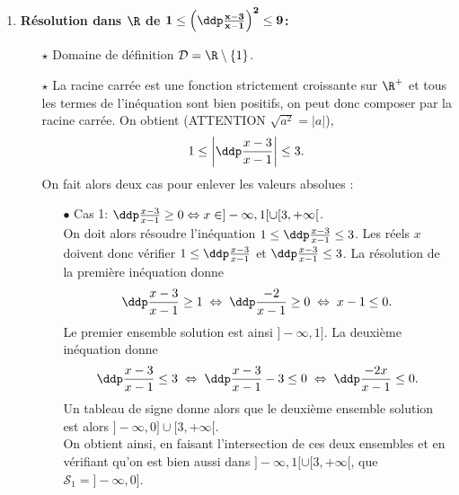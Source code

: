 \begin{correction}
\begin{enumerate}
\item \textbf{R\'esolution dans $\mathbf{\R}$ de $\mathbf{1\leq \left(\ddp\frac{x-3}{x-1}   \right)^2\leq 9}$:}\\
\noindent \begin{itemize}
\item[$\star$] Domaine de d\'efinition $\mathcal{D}=\R\setminus\lbrace 1 \rbrace$.
\item[$\star$] La racine carr\'ee est une fonction strictement croissante sur $\R^+$ et tous les termes de l'in\'equation sont bien positifs, on peut donc composer par la racine carr\'ee. On obtient (ATTENTION $\sqrt{a^2}=|a|$),
$$1\leq \left| \ddp\frac{x-3}{x-1} \right|\leq 3.$$ 
On fait alors deux cas pour enlever les valeurs absolues :
\noindent \begin{itemize}
\item[$\bullet$] Cas 1: $\ddp\frac{x-3}{x-1} \geq 0\Leftrightarrow x\in\rbrack -\infty, 1\lbrack\cup\lbrack 3,+\infty \lbrack$.\\
\noindent On doit alors r\'esoudre l'in\'equation $1\leq \ddp\frac{x-3}{x-1}\leq 3$. Les r\'eels $x$ doivent donc v\'erifier $1\leq \ddp\frac{x-3}{x-1}$ et $\ddp\frac{x-3}{x-1}\leq 3$. La r\'esolution de la premi\`ere in\'equation donne
$$\ddp\frac{x-3}{x-1}\geq 1 \; \Leftrightarrow \;  \ddp\frac{-2}{x-1}\geq 0 \; \Leftrightarrow \; x-1\leq 0.$$
Le premier ensemble solution est ainsi $\rbrack -\infty,1\rbrack$. La deuxi\`eme in\'equation donne
$$\ddp\frac{x-3}{x-1}\leq 3 \; \Leftrightarrow \; \ddp\frac{x-3}{x-1}- 3 \leq 0 \; \Leftrightarrow \; \ddp\frac{-2x}{x-1}\leq 0.$$
Un tableau de signe donne alors que le deuxi\`eme ensemble solution est alors $\rbrack -\infty, 0\rbrack\cup \lbrack 3,+\infty\lbrack$.\\
\noindent On obtient ainsi, en faisant l'intersection de ces deux ensembles et en v\'erifiant qu'on est bien aussi dans $\rbrack -\infty, 1\lbrack\cup\lbrack 3,+\infty \lbrack$, que $\mathcal{S}_1=\rbrack -\infty, 0\rbrack$.


\end{itemize}
\end{itemize}
\end{enumerate}
\end{correction}
